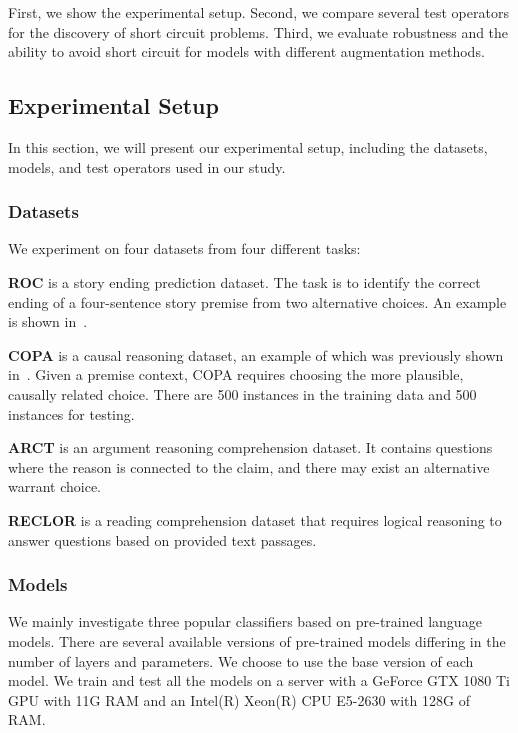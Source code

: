 First, we show the experimental setup. 
Second, we compare several test operators for the discovery of short circuit problems. 
Third, we evaluate robustness and the ability to avoid short circuit 
for models with different augmentation methods.

\subsection{Experimental Setup}
\label{sec:setup}

In this section, we will present our experimental setup, including the datasets, models, and test operators used in our study.

\subsubsection{Datasets}

We experiment on four datasets from four different tasks:

\textbf{ROC} is a story ending prediction dataset. The task is to identify the correct ending of a four-sentence story premise from two alternative choices. An example is shown in~.

\textbf{COPA} is a causal reasoning dataset, an example of which was previously shown in~. Given a premise context, COPA requires choosing the more plausible, causally related choice. There are 500 instances in the training data and 500 instances for testing.

\textbf{ARCT} is an argument reasoning comprehension dataset. It contains questions where the reason is connected to the claim, and there may exist an alternative warrant choice.

\textbf{RECLOR} is a reading comprehension dataset that requires logical reasoning to answer questions based on provided text passages.

\subsubsection{Models}

We mainly investigate three popular classifiers based on pre-trained language models. There are several available versions of pre-trained models differing in the number of layers and parameters. We choose to use the base version of each model. We train and test all the models on a server with a GeForce GTX 1080 Ti GPU with 11G RAM and an Intel(R) Xeon(R) CPU E5-2630 with 128G of RAM.

